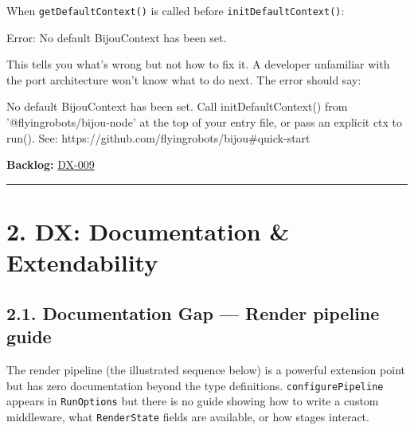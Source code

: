 When \texttt{g\allowbreak{}e\allowbreak{}t\allowbreak{}D\allowbreak{}e\allowbreak{}f\allowbreak{}a\allowbreak{}u\allowbreak{}l\allowbreak{}t\allowbreak{}C\allowbreak{}o\allowbreak{}n\allowbreak{}t\allowbreak{}e\allowbreak{}x\allowbreak{}t\allowbreak{}(\allowbreak{})} is called before \texttt{i\allowbreak{}n\allowbreak{}i\allowbreak{}t\allowbreak{}D\allowbreak{}e\allowbreak{}f\allowbreak{}a\allowbreak{}u\allowbreak{}l\allowbreak{}t\allowbreak{}C\allowbreak{}o\allowbreak{}n\allowbreak{}t\allowbreak{}e\allowbreak{}x\allowbreak{}t\allowbreak{}(\allowbreak{})}:

\begin{CodeBlock}
Error: No default BijouContext has been set.
\end{CodeBlock}

This tells you what's wrong but not how to fix it. A developer unfamiliar with the port architecture won't know what to do next. The error should say:

\begin{CodeBlock}
No default BijouContext has been set.
Call initDefaultContext() from '@flyingrobots/bijou-node' at the top
of your entry file, or pass an explicit ctx to run().
See: https://github.com/flyingrobots/bijou#quick-start
\end{CodeBlock}

\textbf{Backlog:} \href{https://github.com/flyingrobots/bijou/blob/cbd70612140e7a450d764b3c7be1c6af878b99bc/docs/method/graveyard/legacy-backlog/inbox/DX-009-context-auto-init-and-error-messages.md}{DX-009}

\begin{center}\rule{0.5\linewidth}{0.5pt}\end{center}

\section{2. DX: Documentation \& Extendability}\label{record-411-dx-documentation-extendability}

\subsection{2.1. Documentation Gap --- Render pipeline guide}\label{record-411-documentation-gap-render-pipeline-guide}

The render pipeline (the illustrated sequence below) is a powerful extension point but has zero documentation beyond the type definitions. \texttt{c\allowbreak{}o\allowbreak{}n\allowbreak{}f\allowbreak{}i\allowbreak{}g\allowbreak{}u\allowbreak{}r\allowbreak{}e\allowbreak{}P\allowbreak{}i\allowbreak{}p\allowbreak{}e\allowbreak{}l\allowbreak{}i\allowbreak{}n\allowbreak{}e} appears in \texttt{R\allowbreak{}u\allowbreak{}n\allowbreak{}O\allowbreak{}p\allowbreak{}t\allowbreak{}i\allowbreak{}o\allowbreak{}n\allowbreak{}s} but there is no guide showing how to write a custom middleware, what \texttt{R\allowbreak{}e\allowbreak{}n\allowbreak{}d\allowbreak{}e\allowbreak{}r\allowbreak{}S\allowbreak{}t\allowbreak{}a\allowbreak{}t\allowbreak{}e} fields are available, or how stages interact.


